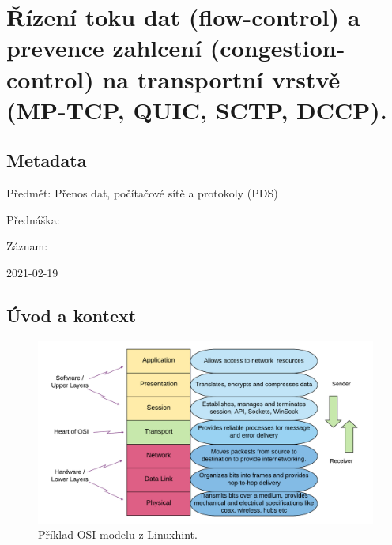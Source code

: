 

\graphicspath{{pds/rizeni_toku_a_prevence_zahlceni}}


\chapter{Řízení toku dat (flow-control) a prevence zahlcení (congestion-control) na transportní vrstvě (MP-TCP, QUIC, SCTP, DCCP).}


\section{Metadata}

\begin{compactitem}
    \item Předmět: Přenos dat, počítačové sítě a protokoly (PDS)
    \item Přednáška:
    \begin{compactitem}
        \item {}
    \end{compactitem}
    \item Záznam:
    \begin{compactitem}
        \item 2021-02-19
    \end{compactitem}
\end{compactitem}


\section{Úvod a kontext}

\begin{figure}[H]
    \centering
    \includegraphics[width=1\linewidth]{osi_model_linuxhint.png}
    \caption{Příklad OSI modelu z Linuxhint.}
\end{figure}

